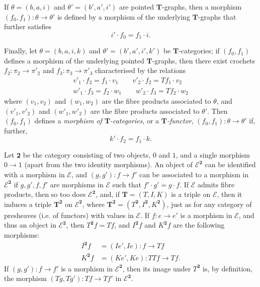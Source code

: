 \documentclass[fleqn]{article}
\newcommand{\oldpage}[1]{\marginpar{\footnotesize$\Big\vert$ \textit{p.~#1}}}
\newcommand{\TT}{\mathbf{T}}
\newcommand{\cat}[1]{\mathcal{#1}}
\begin{document}
If $\theta=(b,a,i)$ and $\theta'=(b',a',i')$ are pointed $\TT$-graphs, then a morphism $(f_0,f_1)\colon\theta\to\theta'$ is defined by a morphism of the underlying $\TT$-graphs that further satisfies
\[
  i'\cdot f_0
  = f_1\cdot i.
  \tag{2'}
\]

\oldpage{228}
Finally, let $\theta=(b,a,i,k)$ and $\theta'=(b',a',i',k')$ be $\TT$-categories;
if $(f_0,f_1)$ defines a morphism of the underlying pointed $\TT$-graphs, then there exist crochets $f_2\colon\pi_2\to\pi'_2$ and $f_3\colon\pi_3\to\pi'_3$ characterised by the relations
\[
  \begin{gathered}
    v'_1\cdot f_2
    = f_1\cdot v_1
    \qquad
    v'_2\cdot f_2
    = Tf_1\cdot v_2
  \\w'_1\cdot f_3
    = f_2\cdot w_1
    \qquad
    w'_2\cdot f_3
    = T f_2\cdot w_2
  \end{gathered}
\]
where $(v_1,v_2)$ and $(w_1,w_2)$ are the fibre products associated to $\theta$, and $(v'_1,v'_2)$ and $(w'_1,w'_2)$ are the fibre products associated to $\theta'$.
Then $(f_0,f_1)$ defines a \emph{morphism of $\TT$-categories}, or a \emph{$\TT$-functor}, $(f_0,f_1)\colon\theta\to\theta'$ if, further,
\[
  k'\cdot f_2
  = f_1\cdot k.
  \tag{3'}
\]

Let $\mathbf{2}$ be the category consisting of two objects, $0$ and $1$, and a single morphism $0\to1$ (apart from the two identity morphisms).
An object of $\cat{E}^\mathbf{2}$ can be identified with a morphism in $\cat{E}$, and $(g,g')\colon f\to f'$ can be associated to a morphism in $\cat{E}^\mathbf{2}$ if $g,g',f,f'$ are morphisms in $\cat{E}$ such that $f'\cdot g'=g\cdot f$.
If $\cat{E}$ admits fibre products, then so too does $\cat{E}^\mathbf{2}$, and, if $\TT=(T,I,K)$ is a triple on $\cat{E}$, then it induces a triple $\TT^\mathbf{2}$ on $\cat{E}^\mathbf{2}$, where $\TT^\mathbf{2}=(T^\mathbf{2},I^\mathbf{2},K^\mathbf{2})$, just as for any category of presheaves (i.e. of functors) with values in $\cat{E}$.
If $f\colon e\to e'$ is a morphism in $\cat{E}$, and thus an object in $\cat{E}^\mathbf{2}$, then $T^\mathbf{2}f=Tf$, and $I^\mathbf{2}f$ and $K^\mathbf{2}f$ are the following morphisms:
\[
  \begin{aligned}
    I^\mathbf{2}f
    &= (Ie',Ie)
    \colon f
    \to Tf
  \\K^\mathbf{2}f
    &= (Ke', Ke)
    \colon TTf
    \to Tf.
  \end{aligned}
\]
If $(g,g')\colon f\to f'$ is a morphism in $\cat{E}^\mathbf{2}$, then its image under $T^\mathbf{2}$ is, by definition, the morphism $(Tg,Tg')\colon Tf\to Tf'$ in $\cat{E}^\mathbf{2}$.
\end{document}
